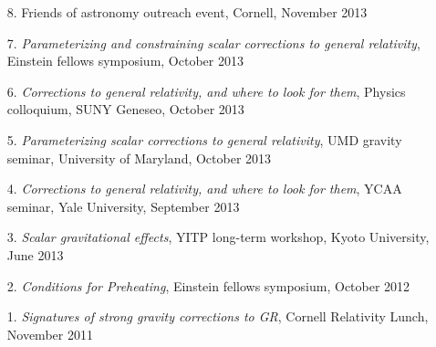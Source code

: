 \begin{enumerate}
{    gravitational waves},
  Strong gravity seminar, Perimeter Institute, October 2014.
\item[{8.}]
  Friends of astronomy outreach event, Cornell, November 2013
\item[{7.}]
  {\it Parameterizing and constraining scalar corrections to general relativity},
  Einstein fellows symposium, October 2013
\item[{6.}]
  {\it Corrections to general relativity, and where to look for them},
  Physics colloquium, SUNY Geneseo, October 2013
\item[{5.}]
  {\it Parameterizing scalar corrections to general relativity},
  UMD gravity seminar,
  University of Maryland, October 2013
\item[{4.}]
  {\it Corrections to general relativity, and where to look for them},
  YCAA seminar, Yale University, September 2013
\item[{3.}]
  {\it Scalar gravitational effects},
  YITP long-term workshop, Kyoto University, June 2013
\item[{2.}]
  {\it Conditions for Preheating},
  Einstein fellows symposium, October 2012
\item[{1.}]
  {\it Signatures of strong gravity corrections to GR},
  Cornell Relativity Lunch, November 2011
\end{enumerate}

